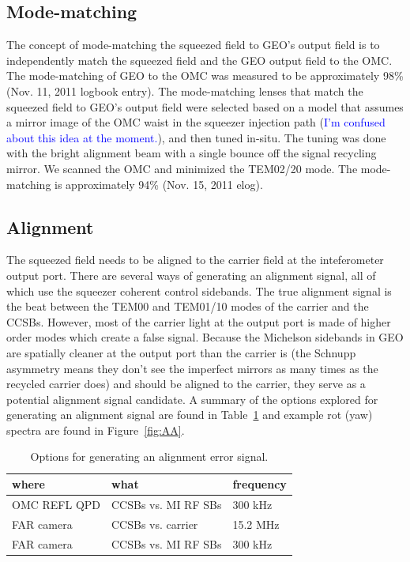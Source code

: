 \documentclass{ligodoc}
\begin{document}
\subsection{Mode-matching}
The concept of mode-matching the squeezed field to GEO's output field
is to independently match the squeezed field and the GEO output field
to the OMC. The mode-matching of GEO to the OMC was measured to be
approximately 98\% (Nov. 11, 2011 logbook entry). The mode-matching
lenses that match the squeezed field to GEO's output field were
selected based on a model that assumes a mirror image of the OMC waist
in the squeezer injection path (\textcolor{blue}{I'm confused about
  this idea at the moment.}), and then tuned in-situ. The tuning was
done with the bright alignment beam with a single bounce off the
signal recycling mirror. We scanned the OMC and minimized the TEM02/20
mode. The mode-matching is approximately 94\% (Nov. 15, 2011 elog).


\subsection{Alignment}
The squeezed field needs to be aligned to the carrier field at the
inteferometer output port. There are several ways of generating an
alignment signal, all of which use the squeezer coherent control
sidebands. The true alignment signal is the beat between the TEM00 and
TEM01/10 modes of the carrier and the CCSBs. However, most of the
carrier light at the output port is made of higher order modes which
create a false signal. Because the Michelson sidebands in GEO are
spatially cleaner at the output port than the carrier is (the Schnupp
asymmetry means they don't see the imperfect mirrors as many times as
the recycled carrier does) and should be aligned to the carrier, they
serve as a potential alignment signal candidate. A summary of the
options explored for generating an alignment signal are found in
Table~\ref{tab:AA} and example rot (yaw) spectra are found in
Figure~\ref{fig:AA}.

\begin{table}
\centering
\caption{Options for generating an alignment error signal.}
\begin{tabular}{l l l}
\hline
where & what & frequency \\
\hline
OMC REFL QPD &     CCSBs vs. MI RF SBs & 300 kHz \\
FAR camera &          CCSBs vs. carrier & 15.2 MHz \\
FAR camera &        CCSBs vs. MI RF SBs & 300 kHz \\
\hline
\end{tabular}
\label{tab:AA}
\end{table}
\end{document}
